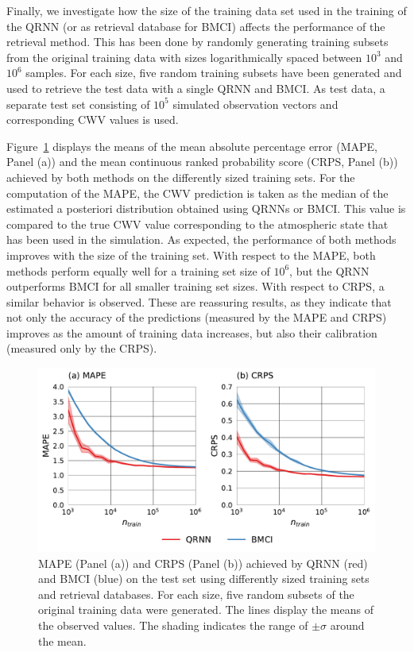 \documentclass[journal abbreviation, manuscript]{copernicus}
\begin{document}
Finally, we investigate how the size of the training data set used in the training
of the QRNN (or as retrieval database for BMCI) affects the performance of the
retrieval method. This has been done by randomly generating training subsets
from the original training data with sizes logarithmically spaced between $10^3$
and $10^6$ samples. For each size, five random training subsets have been
generated and used to retrieve the test data with a single QRNN and BMCI. As test data,
a separate test set consisting of $10^5$ simulated observation vectors and
corresponding CWV values is used.

Figure~\ref{fig:mape_crps} displays the means of the mean absolute percentage
error (MAPE, Panel (a)) and the mean continuous ranked probability score (CRPS,
Panel (b)) achieved by both methods on the differently sized training sets.
For the computation of the MAPE, the CWV prediction is taken as the median of
the estimated a posteriori distribution obtained using QRNNs or BMCI. This value
is compared to the true CWV value corresponding to the atmospheric state that
has been used in the simulation. As expected, the performance of both methods
improves with the size of the training set. With respect to the MAPE, both
methods perform equally well for a training set size of $10^6$, but the QRNN
outperforms BMCI for all smaller training set sizes. With respect to CRPS, a
similar behavior is observed. These are reassuring results, as they indicate
that not only the accuracy of the predictions (measured by the MAPE and CRPS) improves
as the amount of training data increases, but also their calibration (measured
 only by the CRPS).


  \begin{figure}[hbpt!]
    \includegraphics[width = 0.8\linewidth]{../plots/fig06}
    \caption{MAPE (Panel (a)) and CRPS (Panel (b)) achieved by QRNN (red) and BMCI (blue)
      on the test set using differently sized training sets and retrieval
    databases. For each size, five random subsets of the original training data were
    generated. The lines display the means of the observed values. The shading
    indicates the range of $\pm \sigma$ around the mean.}
    \label{fig:mape_crps}
  \end{figure}
\end{document}
